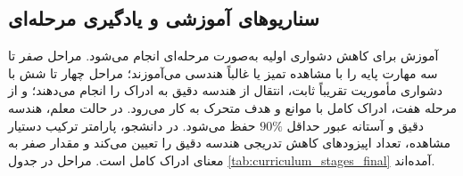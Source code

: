 \subsection{سناریوهای آموزشی و یادگیری مرحله‌ای}
\label{subsec:curriculum_learning_final}

آموزش برای کاهش دشواری اولیه به‌صورت مرحله‌ای انجام می‌شود. مراحل صفر تا سه مهارت پایه را با مشاهده تمیز یا غالباً هندسی می‌آموزند؛ مراحل چهار تا شش با دشواری مأموریت تقریباً ثابت، انتقال از هندسه دقیق به ادراک را انجام می‌دهند؛ و از مرحله هفت، ادراک کامل با موانع و هدف متحرک به کار می‌رود. در حالت معلم، هندسه دقیق و آستانه عبور حداقل \(90\%\) حفظ می‌شود. در دانشجو، پارامتر ترکیب دستیار مشاهده، تعداد اپیزودهای کاهش تدریجی هندسه دقیق را تعیین می‌کند و مقدار صفر به معنای ادراک کامل است. مراحل در جدول \ref{tab:curriculum_stages_final} آمده‌اند.

\begin{table}[htbp]
	\centering
	\caption{مراحل یادگیری مرحله‌ای در آموزش عامل}
	\label{tab:curriculum_stages_final}
\end{table}

